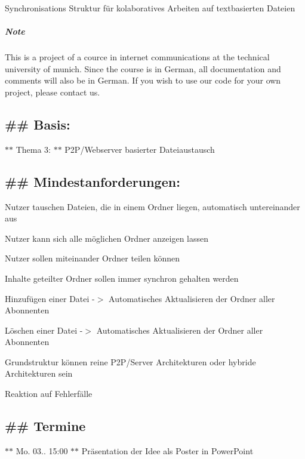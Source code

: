 Synchronisations Struktur für kolaboratives Arbeiten auf textbasierten Dateien

\subparagraph*{Note}

\begin{DoxyVerb}This is a project of a cource in internet communications at the technical university of munich. Since the course is in German, all documentation and comments will also be in German. If you wish to use our code for your own project, please contact us.
\end{DoxyVerb}


\subsection*{\#\# Basis\-: }

$\ast$$\ast$ Thema 3\-: $\ast$$\ast$ P2\-P/\-Webserver basierter Dateiaustausch

\subsection*{\#\# Mindestanforderungen\-: }


\begin{DoxyItemize}
\item Nutzer tauschen Dateien, die in einem Ordner liegen, automatisch untereinander aus
\item Nutzer kann sich alle möglichen Ordner anzeigen lassen
\item Nutzer sollen miteinander Ordner teilen können
\item Inhalte geteilter Ordner sollen immer synchron gehalten werden
\begin{DoxyItemize}
\item Hinzufügen einer Datei -\/$>$ Automatisches Aktualisieren der Ordner aller Abonnenten
\item Löschen einer Datei -\/$>$ Automatisches Aktualisieren der Ordner aller Abonnenten
\end{DoxyItemize}
\item Grundstruktur können reine P2\-P/\-Server Architekturen oder hybride Architekturen sein
\item Reaktion auf Fehlerfälle
\end{DoxyItemize}

\subsection*{\#\# Termine }

$\ast$$\ast$ Mo. 03.. 15\-:00 $\ast$$\ast$ Präsentation der Idee als Poster in Power\-Point

